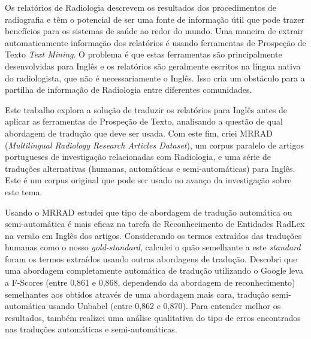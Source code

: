 \begin{abstractspt}

Os relatórios de Radiologia descrevem os resultados dos procedimentos de radiografia e têm o potencial de ser uma fonte de informação útil que pode trazer benefícios para os sistemas de saúde ao redor do mundo. Uma maneira de extrair automaticamente informação dos relatórios é usando ferramentas de Prospeção de Texto \textit{Text Mining}. O problema é que estas ferramentas são principalmente desenvolvidas para Inglês e os relatórios são geralmente escritos na língua nativa do radiologista, que não é necessariamente o Inglês. Isso cria um obstáculo para a partilha de informação de Radiologia entre diferentes comunidades.

Este trabalho explora a solução de traduzir os relatórios para Inglês antes de aplicar as ferramentas de Prospeção de Texto, analisando a questão de qual abordagem de tradução que deve ser usada. Com este fim, criei MRRAD (\textit{Multilingual Radiology Research Articles Dataset}), um corpus paralelo de artigos portugueses de investigação relacionadas com Radiologia, e uma série de traduções alternativas (humanas, automáticas e semi-automáticas) para Inglês. Este é um corpus original que pode ser usado no avanço da investigação sobre este tema. 

Usando o MRRAD estudei que tipo de abordagem de tradução automática ou semi-automática é mais eficaz na tarefa de Reconhecimento de Entidades RadLex na versão em Inglês dos artigos. Considerando os termos extraídos das traduções humanas como o nosso \textit{gold-standard}, calculei o quão semelhante a este \textit{standard} foram os termos extraídos usando outras abordagens de tradução. Descobri que uma abordagem completamente automática de tradução utilizando o Google leva a F-Scores (entre 0,861 e 0,868, dependendo da abordagem de reconhecimento) semelhantes aos obtidos através de uma abordagem mais cara, tradução semi-automática usando Unbabel (entre 0,862 e 0,870). Para entender melhor os resultados, também realizei uma análise qualitativa do tipo de erros encontrados nas traduções automáticas e semi-automáticas.

\end{abstractspt}

